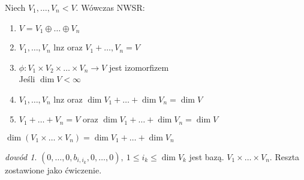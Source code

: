 \documentclass[10pt]{article}
\theoremstyle{definition}
\theoremstyle{definition}
\theoremstyle{definition}
\theoremstyle{definition}
\theoremstyle{remark}
\newtheorem*{dd}{dowód}
\theoremstyle{definition}
\theoremstyle{definition}
\theoremstyle{definition}
\theoremstyle{definition}
\theoremstyle{definition}
\begin{document}
\begin{ft} 
    Niech $V_1,\ldots,V_n < V$. Wówczas NWSR:
    \begin{enumerate}[(1)]
        \item $V = V_1 \oplus \ldots \oplus V_n$
        \item $V_1,\ldots,V_n$ lnz oraz $V_1+\ldots,V_n=V$
        \item $\phi : V_1 \times V_2 \times \ldots \times V_n \to V$ jest izomorfizem \\
        Jeśli $\dim V < \infty$
        \item $V_1,\ldots,V_n$ lnz oraz $\dim V_1 + \ldots + \dim V_n = \dim V$ 
        \item $V_1+\ldots + V_n = V$ oraz $\dim V_1 + \ldots + \dim V_n = \dim V$
    \end{enumerate}
\end{ft} 
\begin{lem} \label{indeksior}
    $\dim (V_1 \times \ldots \times V_n) = \dim V_1 + \ldots + \dim V_n$
    \begin{dd} 
        $(0,\ldots,0,b_{i,i_k},0,\ldots,0),\ 1 \le i_k \le \dim V_k$
        jest bazą. $V_1 \times \ldots \times V_n$. Reszta zostawione jako ćwiczenie.
    \end{dd} 
\end{lem} 
\end{document}
